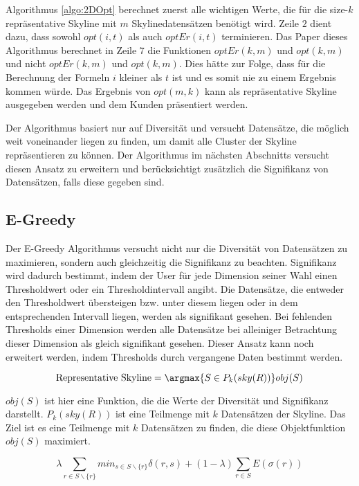 Algorithmus \ref{algo:2DOpt} berechnet zuerst alle wichtigen Werte, die für die size-$k$ repräsentative Skyline mit $m$ Skylinedatensätzen benötigt wird. Zeile $2$ dient dazu, dass sowohl $opt(i,t)$ als auch $optEr(i,t)$ terminieren. Das Paper \cite{Tao:2009:DRS:1546683.1547325} dieses Algorithmus berechnet in Zeile $7$ die Funktionen $optEr(k,m)$ und $opt(k,m)$ und nicht $optEr(k,m)$ und $opt(k,m)$. Dies hätte zur Folge, dass für die Berechnung der Formeln $i$ kleiner als $t$ ist und es somit nie zu einem Ergebnis kommen würde.
Das Ergebnis von $opt(m,k)$ kann als repräsentative Skyline ausgegeben werden und dem Kunden präsentiert werden.

Der Algorithmus basiert nur auf Diversität und versucht Datensätze, die möglich weit voneinander liegen zu finden, um damit alle Cluster der Skyline repräsentieren zu können. Der Algorithmus im nächsten Abschnitts versucht diesen Ansatz zu erweitern und berücksichtigt zusätzlich die Signifikanz von Datensätzen, falls diese gegeben sind.  
\subsection{E-Greedy}
\label{ch:Analyse:sec:repSkyAlgos:subsec:eGreedy}
Der E-Greedy Algorithmus \cite{magnani2014taking} versucht nicht nur die Diversität von Datensätzen zu maximieren, sondern auch gleichzeitig die Signifikanz zu beachten.
Signifikanz wird dadurch bestimmt, indem der User für jede Dimension seiner Wahl einen Thresholdwert oder ein Thresholdintervall angibt. Die Datensätze, die entweder den Thresholdwert übersteigen bzw. unter diesem liegen oder in dem entsprechenden Intervall liegen, werden als signifikant gesehen. Bei fehlenden Thresholds einer Dimension werden alle Datensätze bei alleiniger Betrachtung dieser Dimension als gleich signifikant gesehen. Dieser Ansatz kann noch erweitert werden, indem Thresholds durch vergangene Daten bestimmt werden. 

$$\text{Representative Skyline} = \argmax{S \in{P_k(sky(R))}} obj(S)$$

$obj(S)$ ist hier eine Funktion, die die Werte der Diversität und Signifikanz darstellt. $P_k(sky(R))$ ist eine Teilmenge mit $k$ Datensätzen der Skyline. Das Ziel ist es eine Teilmenge mit $k$ Datensätzen zu finden, die diese Objektfunktion $obj(S)$ maximiert.

$$\lambda \sum\limits_{r \in{S \backslash \{r\}}} min_{s \in S \backslash \{r\}}\delta(r,s)+(1- \lambda) \sum\limits_{r \in{S}}E(\sigma(r))$$

